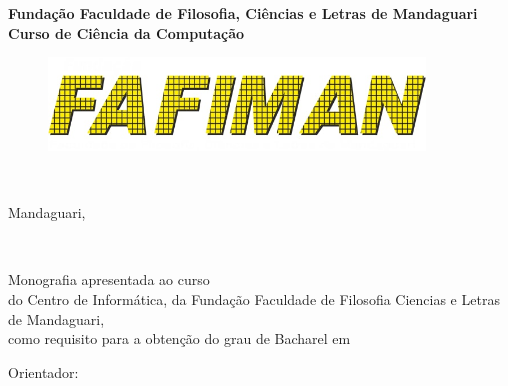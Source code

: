 \documentclass{tcc}
\begin{document}
\pagestyle{empty} %


\begin{center}
\LARGE{\bf
Fundação Faculdade de Filosofia, Ciências e Letras de Mandaguari
}\\
\Large{\bf
    Curso de Ciência da Computação
}
\end{center}
\begin{figure}[H]
\vspace*{3cm}
\centering
\includegraphics[width=100mm]{imagens/logo2.jpg}
\vspace*{3cm}
\end{figure}


\begin{center}
\LARGE{\bf \thetitle}\\
\end{center}

\vspace{1em}

\vfill

\vspace{2in}

\begin{center}
\bf\theauthor
\vspace*{2cm}
\end{center}

\begin{center}
Mandaguari, \the\year
\end{center}
\afterpage{\blankpage \addtocounter{page}{1}} %

\newpage
\begin{center}
\theauthor
\end{center}
\vspace{3in}
\begin{center}
\LARGE{\thetitle}\\
\end{center}

\vspace{2in}

\begin{flushright}
Monografia apresentada ao curso \nomedocurso \\ do Centro de Informática, da Fundação Faculdade de Filosofia Ciencias e Letras de Mandaguari, \\ como requisito para a obtenção do grau de Bacharel em \titulobar
\\
\vspace{0.2in}

Orientador: \orientador


\end{flushright}
\end{document}
